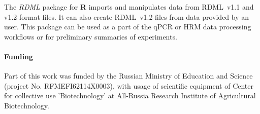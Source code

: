 \documentclass{bioinfo}
\begin{document}
	The \textit{RDML} package for \textbf{R} imports and manipulates data from RDML~v1.1 and 
	v1.2 format files. It can also create RDML~v1.2 files from data provided by an user. 
	This package can be used as a part of the qPCR or HRM data processing workflows or 
	for preliminary summaries of experiments.
	
	\paragraph{Funding\textcolon}  Part of this work was funded by the Russian
	Ministry of Education and Science (project No. RFMEFI62114X0003), with usage of
	scientific equipment of Center for collective use ’Biotechnology’ at All-Russia
	Research Institute of Agricultural Biotechnology.
	
	
	
\end{document}
